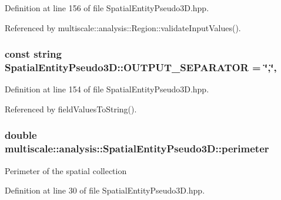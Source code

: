 Definition at line 156 of file Spatial\-Entity\-Pseudo3\-D.\-hpp.



Referenced by multiscale\-::analysis\-::\-Region\-::validate\-Input\-Values().

\hypertarget{classmultiscale_1_1analysis_1_1SpatialEntityPseudo3D_a4ee08be9b4119b90f0a996704d179635}{
\subsubsection[{O\-U\-T\-P\-U\-T\-\_\-\-S\-E\-P\-A\-R\-A\-T\-O\-R}]{\setlength{\rightskip}{0pt plus 5cm}const string Spatial\-Entity\-Pseudo3\-D\-::\-O\-U\-T\-P\-U\-T\-\_\-\-S\-E\-P\-A\-R\-A\-T\-O\-R = \char`\"{},\char`\"{}\hspace{0.3cm}{\ttfamily [static]}, {\ttfamily [protected]}}}\label{classmultiscale_1_1analysis_1_1SpatialEntityPseudo3D_a4ee08be9b4119b90f0a996704d179635}


Definition at line 154 of file Spatial\-Entity\-Pseudo3\-D.\-hpp.



Referenced by field\-Values\-To\-String().

\hypertarget{classmultiscale_1_1analysis_1_1SpatialEntityPseudo3D_aee84039be272f902a2d871f61da47360}{
\subsubsection[{perimeter}]{\setlength{\rightskip}{0pt plus 5cm}double multiscale\-::analysis\-::\-Spatial\-Entity\-Pseudo3\-D\-::perimeter\hspace{0.3cm}{\ttfamily [protected]}}}\label{classmultiscale_1_1analysis_1_1SpatialEntityPseudo3D_aee84039be272f902a2d871f61da47360}
Perimeter of the spatial collection 

Definition at line 30 of file Spatial\-Entity\-Pseudo3\-D.\-hpp.



